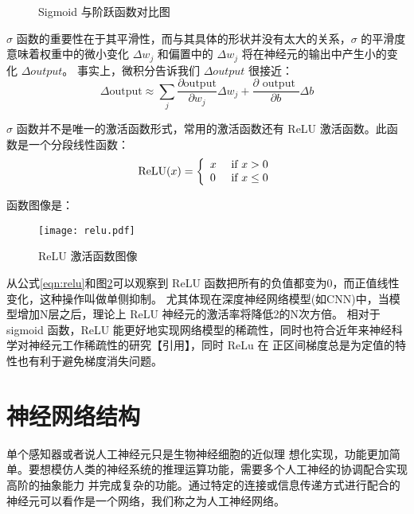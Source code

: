 \begin{figure}[htbp]
	\caption{Sigmoid 与阶跃函数对比图}
	\label{sigmoid_step}
\end{figure}

$\sigma$ 函数的重要性在于其平滑性，而与其具体的形状并没有太大的关系，$\sigma$ 的平滑度意味着权重中的微小变化
$\Delta w_j$ 和偏置中的 $\Delta w_j$ 将在神经元的输出中产生小的变化 $\Delta output$。
 事实上，微积分告诉我们 $\Delta output$ 很接近：
\begin{equation}
	\label{eqn:sigmoiddelta}
	\Delta \mathrm { output } \approx \sum _ { j } \frac { \partial \mathrm { output } } { \partial w _ { j } } \Delta w _ { j } + \frac { \partial \text { output } } { \partial b } \Delta b
\end{equation}

$\sigma$ 函数并不是唯一的激活函数形式，常用的激活函数还有 ReLU 激活函数。此函数是一个分段线性函数：
\begin{equation}
	\label{eqn:relu}
	\operatorname { ReLU } ( x ) = \left\{ \begin{array} { l l } { x } & { \text { if } x > 0 } \\ { 0 } & { \text { if } x \leq 0 } \end{array} \right.
\end{equation}

函数图像是：
\begin{figure}[htbp]
	\texttt{[image: relu.pdf]}
	\caption{ReLU 激活函数图像}
	\label{relu}
\end{figure}

从公式\ref{eqn:relu}和图\ref{relu}可以观察到 ReLU 函数把所有的负值都变为0，而正值线性变化，这种操作叫做单侧抑制。
尤其体现在深度神经网络模型(如CNN)中，当模型增加N层之后，理论上 ReLU 神经元的激活率将降低2的N次方倍。
相对于 sigmoid 函数，ReLU 能更好地实现网络模型的稀疏性，同时也符合近年来神经科学对神经元工作稀疏性的研究【引用】，同时 ReLu 在
正区间梯度总是为定值的特性也有利于避免梯度消失问题。

\section{神经网络结构}
单个感知器或者说人工神经元只是生物神经细胞的近似理
想化实现，功能更加简单。要想模仿人类的神经系统的推理运算功能，需要多个人工神经的协调配合实现高阶的抽象能力
并完成复杂的功能。通过特定的连接或信息传递方式进行配合的神经元可以看作是一个网络，我们称之为人工神经网络。

